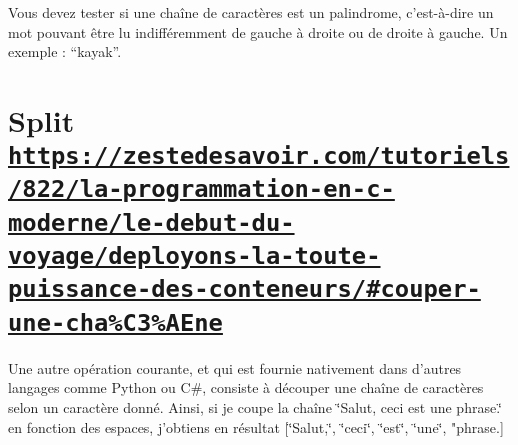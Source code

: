 Vous devez tester si une chaîne de caractères est un palindrome, c’est-\/à-\/dire un mot pouvant être lu indifféremment de gauche à droite ou de droite à gauche. Un exemple \+: “kayak”.

\section*{Split \href{https://zestedesavoir.com/tutoriels/822/la-programmation-en-c-moderne/le-debut-du-voyage/deployons-la-toute-puissance-des-conteneurs/#couper-une-cha%C3%AEne}{\tt https\+://zestedesavoir.\+com/tutoriels/822/la-\/programmation-\/en-\/c-\/moderne/le-\/debut-\/du-\/voyage/deployons-\/la-\/toute-\/puissance-\/des-\/conteneurs/\#couper-\/une-\/cha\%\+C3\%\+A\+Ene}}

Une autre opération courante, et qui est fournie nativement dans d’autres langages comme Python ou C\#, consiste à découper une chaîne de caractères selon un caractère donné. Ainsi, si je coupe la chaîne \char`\"{}\+Salut, ceci est une phrase.\char`\"{} en fonction des espaces, j’obtiens en résultat \mbox{[}\char`\"{}\+Salut,\char`\"{}, \char`\"{}ceci\char`\"{}, \char`\"{}est\char`\"{}, \char`\"{}une\char`\"{}, "phrase.\mbox{]} 